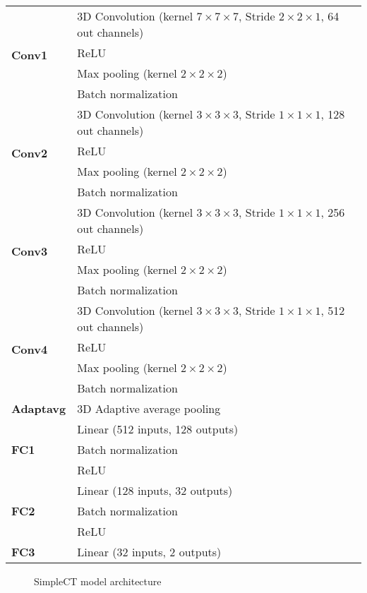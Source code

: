 \begin{longtable}{l|l}
    \hline
    \multirow{4}{*}{\textbf{Conv1}} & 3D Convolution (kernel $7\times7\times7$, Stride $2\times2\times1$, 64 out channels) \\
    & ReLU \\
    & Max pooling (kernel $2\times2\times2$) \\
    & Batch normalization \\
    \hline
    \multirow{4}{*}{\textbf{Conv2}} & 3D Convolution (kernel $3\times3\times3$, Stride $1\times1\times1$, 128 out channels) \\
    & ReLU \\
    & Max pooling (kernel $2\times2\times2$) \\
    & Batch normalization \\
    \hline
    \multirow{4}{*}{\textbf{Conv3}} & 3D Convolution (kernel $3\times3\times3$, Stride $1\times1\times1$, 256 out channels) \\
    & ReLU \\
    & Max pooling (kernel $2\times2\times2$) \\
    & Batch normalization \\
    \hline
    \multirow{4}{*}{\textbf{Conv4}} & 3D Convolution (kernel $3\times3\times3$, Stride $1\times1\times1$, 512 out channels) \\
    & ReLU \\
    & Max pooling (kernel $2\times2\times2$) \\
    & Batch normalization \\
    \hline
    \textbf{Adaptavg} & 3D Adaptive average pooling \\
    \hline
    \multirow{3}{*}{\textbf{FC1}} & Linear (512 inputs, 128 outputs) \\
    & Batch normalization \\
    & ReLU \\
    \hline
    \multirow{3}{*}{\textbf{FC2}} & Linear (128 inputs, 32 outputs) \\
    & Batch normalization \\
    & ReLU \\
    \hline
    \textbf{FC3} & Linear (32 inputs, 2 outputs) \\
    \hline
\end{longtable}

\begin{figure}[h]
    \centering
    \caption{SimpleCT model architecture}
    \label{fig:simple_ct_architecture}
\end{figure}


